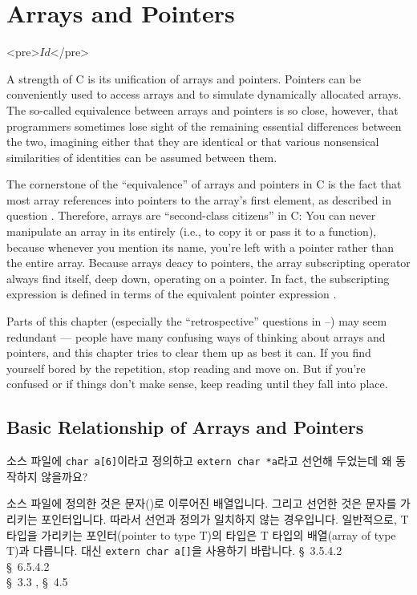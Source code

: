 \chapter{Arrays and Pointers}	\label{chap:arrayptr}

\begin{rawhtml}
<pre>$Id$</pre>
\end{rawhtml}

A strength of C is its unification of arrays and pointers.
Pointers can be conveniently used to access arrays and to simulate dynamically
allocated arrays.  The so-called equivalence between arrays and pointers is
so close, however, that programmers sometimes lose sight of the remaining
essential differences between the two, imagining either that they are
identical or that various nonsensical similarities of identities can be
assumed between them.

The cornerstone of the ``equivalence'' of arrays and pointers in C is the
fact that most array references  into pointers to the array's first
element, as described in question .  Therefore, arrays are
``second-class citizens'' in C: You can never manipulate an array in its
entirely (i.e., to copy it or pass it to a function), because whenever you
mention its name,
you're left with a pointer rather than the entire array. Because arrays
deacy to pointers, the array subscripting operator \TT{[]} always find itself,
deep down, operating on a pointer. In fact, the subscripting expression
 is defined in terms of the equivalent pointer expression
.

Parts of this chapter (especially the ``retrospective'' questions in 
--) may seem redundant --- people have many confusing ways of thinking
about arrays and pointers, and this chapter tries to clear them up as best
it can. If you find yourself bored by the repetition, stop reading and move on.
But if you're confused or if things don't make sense, keep reading until
they fall into place.

\section{Basic Relationship of Arrays and Pointers}
\begin{faq}
	소스 파일에 \verb+char a[6]+이라고 정의하고
        \verb+extern char *a+라고
	선언해 두었는데 왜 동작하지 않을까요?

\A
	소스 파일에 정의한 것은 문자()로 이루어진 배열입니다.  그리고
	선언한 것은 문자를 가리키는 포인터입니다.  따라서 선언과 정의가
	일치하지 않는 경우입니다.  일반적으로, T 타입을 가리키는 포인터(pointer to
	type T)의 타입은 T 타입의 배열(array of type T)과 다릅니다.
	대신 \verb+extern char a[]+을 사용하기 바랍니다.
\R
	\cite{ansi} \S\ 3.5.4.2 \\
	\cite{c89} \S\ 6.5.4.2 \\
	\cite{ctp} \S\ 3.3 , \S\ 4.5 
\end{faq}

